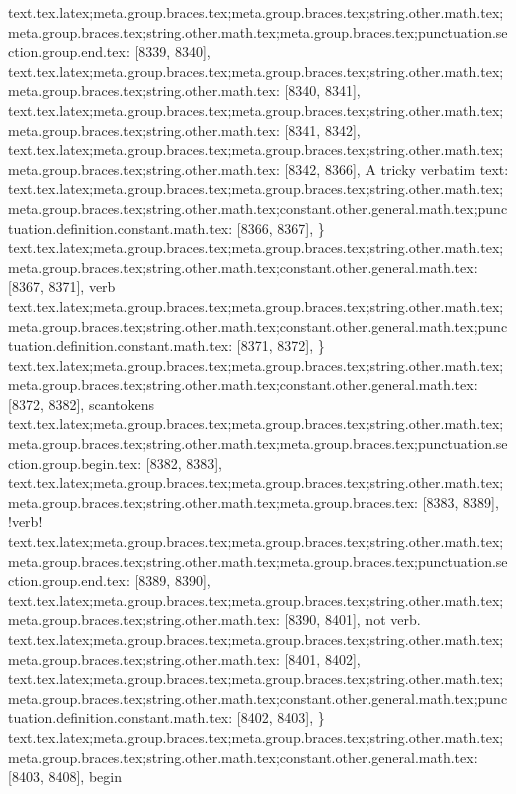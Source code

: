 {{{{{{{{{{{{{{{{{{{{{{{{{{{{{{{{{{{{{{{{{{{{{{{{{{{{{{{{{{{{{{{{{{{{{{{{{{{{{{{{{{{{{{{{{{{{{{{{{{{{{{{{{{{{{{{{{{{{{{{{{{{{{{{{{{{{{{{{{{{{{{{{{{{{{{{{{{{{{{{{{{{{{{{{{{{{{{{{{{{{{{{{{{{{{{{{{{{{{{{{{{{{{{{{{{{{{{{{{{{{{{{{{{{{{{{{{{{{{{{{{{{{{text.tex.latex;meta.group.braces.tex;meta.group.braces.tex;string.other.math.tex;meta.group.braces.tex;string.other.math.tex;meta.group.braces.tex;punctuation.section.group.end.tex: [8339, 8340], {}}
text.tex.latex;meta.group.braces.tex;meta.group.braces.tex;string.other.math.tex;meta.group.braces.tex;string.other.math.tex: [8340, 8341], {
}
text.tex.latex;meta.group.braces.tex;meta.group.braces.tex;string.other.math.tex;meta.group.braces.tex;string.other.math.tex: [8341, 8342], {
}
text.tex.latex;meta.group.braces.tex;meta.group.braces.tex;string.other.math.tex;meta.group.braces.tex;string.other.math.tex: [8342, 8366], {A tricky verbatim text: }
text.tex.latex;meta.group.braces.tex;meta.group.braces.tex;string.other.math.tex;meta.group.braces.tex;string.other.math.tex;constant.other.general.math.tex;punctuation.definition.constant.math.tex: [8366, 8367], {\}
text.tex.latex;meta.group.braces.tex;meta.group.braces.tex;string.other.math.tex;meta.group.braces.tex;string.other.math.tex;constant.other.general.math.tex: [8367, 8371], {verb}
text.tex.latex;meta.group.braces.tex;meta.group.braces.tex;string.other.math.tex;meta.group.braces.tex;string.other.math.tex;constant.other.general.math.tex;punctuation.definition.constant.math.tex: [8371, 8372], {\}
text.tex.latex;meta.group.braces.tex;meta.group.braces.tex;string.other.math.tex;meta.group.braces.tex;string.other.math.tex;constant.other.general.math.tex: [8372, 8382], {scantokens}
text.tex.latex;meta.group.braces.tex;meta.group.braces.tex;string.other.math.tex;meta.group.braces.tex;string.other.math.tex;meta.group.braces.tex;punctuation.section.group.begin.tex: [8382, 8383], {{}
text.tex.latex;meta.group.braces.tex;meta.group.braces.tex;string.other.math.tex;meta.group.braces.tex;string.other.math.tex;meta.group.braces.tex: [8383, 8389], {!verb!}
text.tex.latex;meta.group.braces.tex;meta.group.braces.tex;string.other.math.tex;meta.group.braces.tex;string.other.math.tex;meta.group.braces.tex;punctuation.section.group.end.tex: [8389, 8390], {}}
text.tex.latex;meta.group.braces.tex;meta.group.braces.tex;string.other.math.tex;meta.group.braces.tex;string.other.math.tex: [8390, 8401], { not verb.
}
text.tex.latex;meta.group.braces.tex;meta.group.braces.tex;string.other.math.tex;meta.group.braces.tex;string.other.math.tex: [8401, 8402], {
}
text.tex.latex;meta.group.braces.tex;meta.group.braces.tex;string.other.math.tex;meta.group.braces.tex;string.other.math.tex;constant.other.general.math.tex;punctuation.definition.constant.math.tex: [8402, 8403], {\}
text.tex.latex;meta.group.braces.tex;meta.group.braces.tex;string.other.math.tex;meta.group.braces.tex;string.other.math.tex;constant.other.general.math.tex: [8403, 8408], {begin}
}}}}}}}}}}}}}}}}}}}}}}}}}}}}}}}}}}}}}}}}}}}}}}}}}}}}}}}}}}}}}}}}}}}}}}}}}}}}}}}}}}}}}}}}}}}}}}}}}}}}}}}}}}}}}}}}}}}}}}}}}}}}}}}}}}}}}}}}}}}}}}}}}}}}}}}}}}}}}}}}}}}}}}}}}}}}}}}}}}}}}}}}}}}}}}}}}}}}}}}}}}}}}}}}}}}}}}}}}}}}}}}}}}}}}}}}}}}}}}}}}}}}}}}
